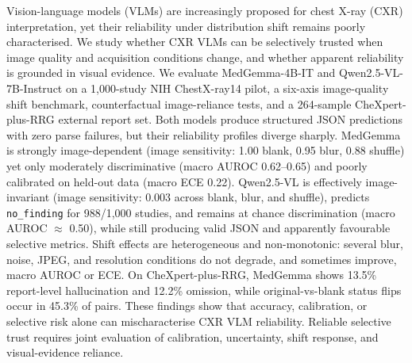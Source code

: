 Vision-language models (VLMs) are increasingly proposed for chest X-ray (CXR) interpretation, yet their reliability under distribution shift remains poorly characterised. We study whether CXR VLMs can be selectively trusted when image quality and acquisition conditions change, and whether apparent reliability is grounded in visual evidence. We evaluate MedGemma-4B-IT and Qwen2.5-VL-7B-Instruct on a 1,000-study NIH ChestX-ray14 pilot, a six-axis image-quality shift benchmark, counterfactual image-reliance tests, and a 264-sample CheXpert-plus-RRG external report set. Both models produce structured JSON predictions with zero parse failures, but their reliability profiles diverge sharply. MedGemma is strongly image-dependent (image sensitivity: 1.00 blank, 0.95 blur, 0.88 shuffle) yet only moderately discriminative (macro AUROC 0.62--0.65) and poorly calibrated on held-out data (macro ECE 0.22). Qwen2.5-VL is effectively image-invariant (image sensitivity: 0.003 across blank, blur, and shuffle), predicts \texttt{no\_finding} for 988/1,000 studies, and remains at chance discrimination (macro AUROC $\approx$ 0.50), while still producing valid JSON and apparently favourable selective metrics. Shift effects are heterogeneous and non-monotonic: several blur, noise, JPEG, and resolution conditions do not degrade, and sometimes improve, macro AUROC or ECE. On CheXpert-plus-RRG, MedGemma shows 13.5\% report-level hallucination and 12.2\% omission, while original-vs-blank status flips occur in 45.3\% of pairs. These findings show that accuracy, calibration, or selective risk alone can mischaracterise CXR VLM reliability. Reliable selective trust requires joint evaluation of calibration, uncertainty, shift response, and visual-evidence reliance.
